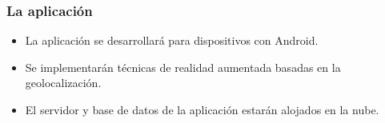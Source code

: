 
\begin{frame}
	\frametitle{La aplicación \ULLAR{}}
	\begin{itemize}
		\item La aplicación se desarrollará para dispositivos con Android. 
		\item Se implementarán técnicas de realidad aumentada basadas en la geolocalización.
		\item El servidor y base de datos de la aplicación estarán alojados en la nube.
	\end{itemize}
	\endblock{}
\end{frame}


\begin{frame}
\end{frame}


% 	




